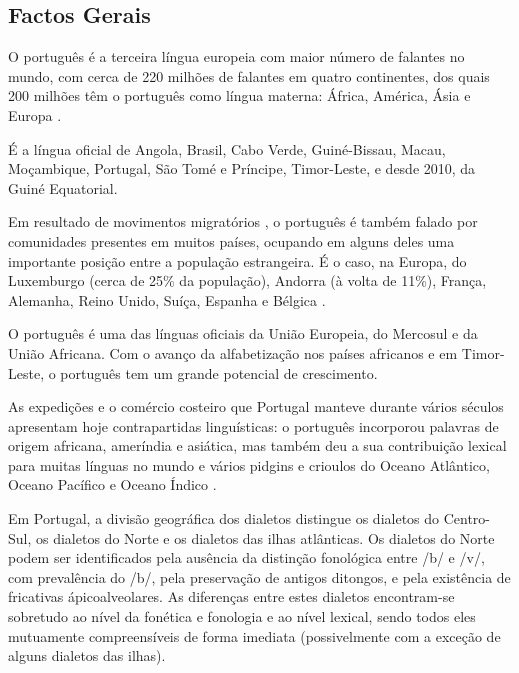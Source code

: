 \begin{multicols}{2}

\subsection{Factos Gerais}

O português é a terceira língua europeia com maior número de falantes no mundo, com cerca de 220 milhões de falantes em quatro continentes, dos quais 200 milhões têm o português como língua materna: África, América, Ásia e Europa \cite{observatorio}  \cite{ethnologue}.

É a língua oficial de Angola, Brasil, Cabo Verde, Guiné-Bissau, Macau, Moçambique, Portugal, São Tomé e Príncipe, Timor-Leste, e desde 2010, da Guiné Equatorial. 


Em resultado de movimentos migratórios  \cite{stat1} \cite{obsemig}, o português é também falado por comunidades presentes em muitos países, ocupando em alguns deles uma importante posição entre a população estrangeira. É o caso, na Europa, do Luxemburgo (cerca de 25\% da população), Andorra (à volta de 11\%), França, Alemanha, Reino Unido, Suíça, Espanha e Bélgica \cite{linha}.

O português é uma das línguas oficiais da União Europeia, do Mercosul e da União Africana. Com o avanço da alfabetização nos países africanos e em Timor-Leste, o português tem um grande potencial de crescimento.

As expedições e o comércio costeiro que Portugal manteve durante vários séculos apresentam hoje contrapartidas linguísticas: o português incorporou palavras de origem africana, ameríndia e asiática, mas também deu a sua contribuição lexical para muitas línguas no mundo e vários pidgins e crioulos do Oceano Atlântico, Oceano Pacífico e Oceano Índico \cite{andrade}  \cite{camoes}. 

Em Portugal, a divisão geográfica dos dialetos \cite{cintra} distingue os dialetos do Centro-Sul, os dialetos do Norte e os dialetos das ilhas atlânticas. 
Os dialetos do Norte podem ser identificados pela ausência da distinção fonológica entre /b/ e /v/, 
com prevalência do /b/, pela preservação de antigos ditongos, e pela existência de fricativas ápicoalveolares. 
As diferenças entre estes dialetos encontram-se sobretudo ao nível da fonética e fonologia e ao nível lexical, sendo
todos eles mutuamente compreensíveis de forma imediata (possivelmente com a exceção de alguns dialetos das ilhas). 


\end{multicols}
